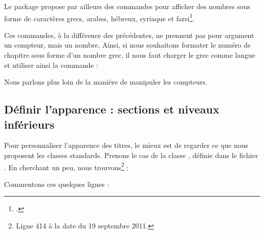 \begin{plusloins}
Le package  propose par ailleurs des commandes pour afficher des nombres sous forme de caractères grecs, arabes, hébreux, syriaque et farsi\footcite{polyglossia_alphabetic_numbering}.

Ces commandes, à la différence des précédentes, ne prennent pas pour argument un compteur, mais un nombre. Ainsi, si nous souhaitons formater le numéro de chapitre sous forme d'un nombre grec, il nous faut charger le grec comme langue et utiliser ainsi la commande :

\begin{latexcode}
\renewcommand{\thechapter}{\greeknumeral{\arabic{chapter}}}
\end{latexcode}
\end{plusloins}

\begin{plusloins}
Nous parlons plus loin de la manière de manipuler les compteurs.
\end{plusloins}

\subsection{Définir l'apparence : sections et niveaux inférieurs}\label{apparencetitre}

Pour personnaliser l'apparence des titres, le mieux est de regarder ce que nous proposent les classes standards. Prenons le cas de la classe , définie dans le fichier . En cherchant un peu, nous trouvons\footnote{Ligne 414 à la date du 19 septembre 2011.} :

\begin{latexcode}
\newcommand\section{\@startsection {section}{1}{\z@}%
                             {-3.5ex \@plus -1ex \@minus -.2ex}%
                             {2.3ex \@plus.2ex}%
                             {\normalfont\Large\bfseries}}
\end{latexcode}

Commentons ces quelques lignes :

